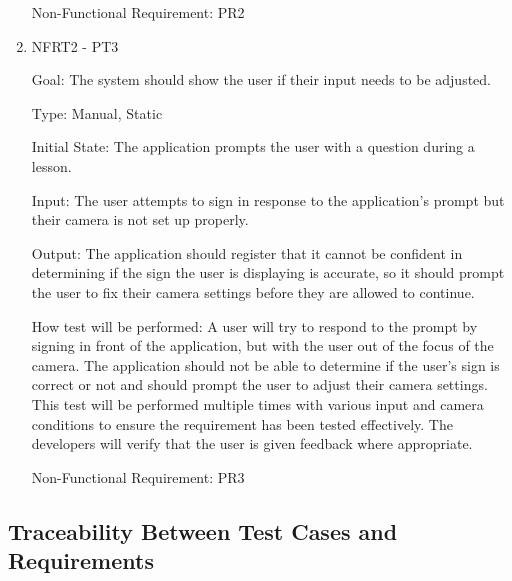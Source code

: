 \documentclass[12pt, titlepage]{article}
\begin{document}
\begin{enumerate}
Non-Functional Requirement: PR2

\item{NFRT2 - PT3}

Goal: The system should show the user if their input needs to be adjusted. 

Type: Manual, Static
					
Initial State: The application prompts the user with a question during a lesson.
					
Input: The user attempts to sign in response to the application's prompt but their camera is not set up properly.
					
Output: The application should register that it cannot be confident in determining if the sign the user is displaying is accurate, so it should prompt the user to fix their camera settings before they are allowed to continue.
					
How test will be performed: A user will try to respond to the prompt by signing in front of the application, but with the user out of the focus of the camera. The application should not be able to determine if the user's sign is correct or not and should prompt the user to adjust their camera settings. This test will be performed multiple times with various input and camera conditions to ensure the requirement has been tested effectively. The developers will verify that the user is given feedback where appropriate. 

Non-Functional Requirement: PR3

\end{enumerate}

\newpage

\subsection{Traceability Between Test Cases and Requirements}
\end{document}
